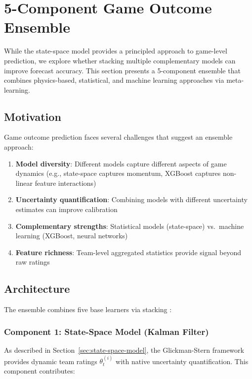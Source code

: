 \section{5-Component Game Outcome Ensemble}
\label{sec:game-ensemble}

While the state-space model provides a principled approach to game-level prediction, we explore whether stacking multiple complementary models can improve forecast accuracy. This section presents a 5-component ensemble that combines physics-based, statistical, and machine learning approaches via meta-learning.

\subsection{Motivation}

Game outcome prediction faces several challenges that suggest an ensemble approach:

\begin{enumerate}
    \item \textbf{Model diversity}: Different models capture different aspects of game dynamics (e.g., state-space captures momentum, XGBoost captures non-linear feature interactions)
    \item \textbf{Uncertainty quantification}: Combining models with different uncertainty estimates can improve calibration
    \item \textbf{Complementary strengths}: Statistical models (state-space) vs.\ machine learning (XGBoost, neural networks)
    \item \textbf{Feature richness}: Team-level aggregated statistics provide signal beyond raw ratings
\end{enumerate}

\subsection{Architecture}

The ensemble combines five base learners via stacking \citep{wolpert1992stacked}:

\subsubsection{Component 1: State-Space Model (Kalman Filter)}

As described in Section~\ref{sec:state-space-model}, the Glickman-Stern framework provides dynamic team ratings $\theta_t^{(i)}$ with native uncertainty quantification. This component contributes:

